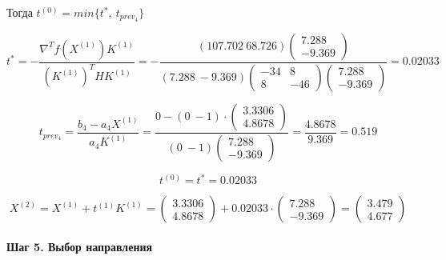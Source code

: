 Тогда $t^{(0)} = min\{t^*,\ t_{prev_4}\}$

\begin{equation*}
	t^* = -\frac{\nabla^T f(X^{(1)}) K^{(1)}}{(K^{(1)})^T H K^{(1)}} = -\frac{(107.702\  68.726) \begin{pmatrix} 7.288 \\ -9.369 \end{pmatrix}}{(7.288\ -9.369) \begin{pmatrix} -34 & 8 \\ 8 & -46 \end{pmatrix} \begin{pmatrix} 7.288 \\ -9.369 \end{pmatrix}} = 0.02033
\end{equation*}

\begin{equation*}
	t_{prev_4} = \frac{b_4 - a_4 X^{(1)}}{a_4 K^{(1)}} = \frac{0 - (0\ -1) \cdot \begin{pmatrix} 3.3306 \\ 4.8678 \end{pmatrix}}{(0\ -1) \begin{pmatrix} 7.288 \\ -9.369 \end{pmatrix}} = \frac{4.8678}{9.369} = 0.519
\end{equation*}

\begin{equation*}
	t^{(0)} = t^* = 0.02033
\end{equation*}

\begin{equation*}
	X^{(2)} = X^{(1)} + t^{(1)} K^{(1)} = \begin{pmatrix}
		3.3306 \\ 4.8678
	\end{pmatrix}
	+
	0.02033 \cdot \begin{pmatrix} 7.288 \\ -9.369 \end{pmatrix}
	=
	\begin{pmatrix}
		3.479 \\ 4.677
	\end{pmatrix}
\end{equation*}

\paragraph{Шаг 5. Выбор направления}



